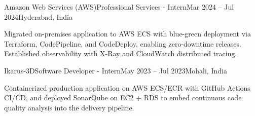 \resumeExp
{Amazon Web Services (AWS)}{Professional Services - Intern}{Mar 2024 -- Jul 2024}{Hyderabad, India}
\resumeItemListStart
    \item[$\diamond$] Migrated on-premises application to AWS ECS with blue-green deployment via Terraform, CodePipeline, and CodeDeploy, enabling zero-downtime releases. Established observability with X-Ray and CloudWatch distributed tracing.
\resumeItemListEnd

\resumeExp
{Ikarus-3D}{Software Developer - Intern}{May 2023 -- Jul 2023}{Mohali, India}
\resumeItemListStart
    \item[$\diamond$] Containerized production application on AWS ECS/ECR with GitHub Actions CI/CD, and deployed SonarQube on EC2 + RDS to embed continuous code quality analysis into the delivery pipeline.
\resumeItemListEnd

\resumeSubHeadingListEnd
